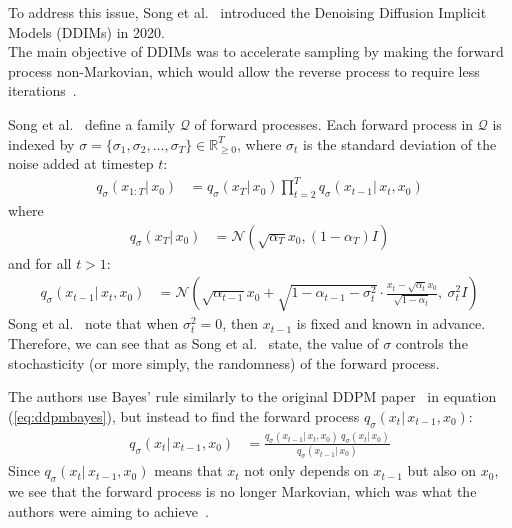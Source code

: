 \documentclass{article}
\numberwithin{equation}{section}
\numberwithin{figure}{section}
\begin{document}
To address this issue, Song et al.~\cite{song2022denoising} introduced the Denoising Diffusion Implicit Models (DDIMs) in 2020. \\
The main objective of DDIMs was to accelerate sampling by making the forward process non-Markovian, which would allow the reverse process to require less iterations~\cite{song2022denoising}.

Song et al.~\cite{song2022denoising} define a family $\mathcal{Q}$ of forward processes. Each forward process in $\mathcal{Q}$ is indexed by $\sigma  = \{ \sigma_1, \sigma_2, \ldots, \sigma_T \} \in \mathbb{R}^T_{\geq 0}$, where $\sigma_t$ is the standard deviation of the noise added at timestep $t$:
\begin{align}
  q_{\sigma}(x_{1:T}| \, x_0) &= q_{\sigma}(x_T | \, x_0) \prod_{t=2}^{T} q_{\sigma}(x_{t-1}| \, x_t, x_0)
\end{align}
where
\begin{align}
  q_{\sigma}(x_T | \, x_0) &= \mathcal{N}(\sqrt{\alpha_T} x_0, (1 - \alpha_T) I)
\end{align}
and for all $t > 1$:
\begin{align}
  q_{\sigma}(x_{t-1} | \, x_t, x_0) &= \mathcal{N}\left( \sqrt{\alpha_{t-1}} x_0 + \sqrt{1 - \alpha_{t-1} - \sigma_t^2} \cdot \frac{x_t - \sqrt{\alpha_t} x_0}{\sqrt{1 - \alpha_t}}, \: \sigma_t^2 I \right)
\end{align}
Song et al.~\cite{song2022denoising} note that when $\sigma_t^2 = 0$, then $x_{t-1}$ is fixed and known in advance. \\
Therefore, we can see that as Song et al.~\cite{song2022denoising} state, the value of $\sigma$ controls the stochasticity (or more simply, the randomness) of the forward process.

The authors use Bayes' rule similarly to the original DDPM paper~\cite{ho2020denoising} in equation (\ref{eq:ddpmbayes}), but instead to find the forward process $q_\sigma(x_t | \, x_{t-1}, x_0)$:
\begin{align}
  q_{\sigma}(x_t | \, x_{t-1}, x_0) &= \frac{q_\sigma (x_{t-1} | \, x_t, x_0) \: q_\sigma (x_t | \, x_0)}{q_\sigma (x_{t-1} | \, x_0)}
\end{align}
Since $q_\sigma (x_t | \, x_{t-1}, x_0)$ means that $x_t$ not only depends on $x_{t-1}$ but also on $x_0$, we see that the forward process is no longer Markovian, which was what the authors were aiming to achieve~\cite{song2022denoising}.
\end{document}
